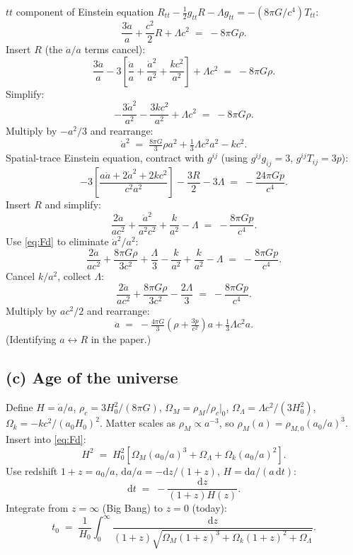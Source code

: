 \documentclass[11pt]{article}
\newcommand{\de}{\mathrm{d}}
\begin{document}
$tt$ component of Einstein equation $R_{tt}-\tfrac12 g_{tt}R-\Lambda g_{tt}=-(8\pi G/c^4)T_{tt}$:
\[
\frac{3\ddot a}{a}+\frac{c^2}{2}R+\Lambda c^2 \;=\; -8\pi G\rho.
\]
Insert $R$ (the $\ddot a/a$ terms cancel):
\[
\frac{3\ddot a}{a}-3\!\left[\frac{\ddot a}{a}+\frac{\dot a^2}{a^2}+\frac{kc^2}{a^2}\right]+\Lambda c^2 \;=\; -8\pi G\rho.
\]
Simplify:
\[
-\frac{3\dot a^2}{a^2}-\frac{3kc^2}{a^2}+\Lambda c^2 \;=\; -8\pi G\rho.
\]
Multiply by $-a^2/3$ and rearrange:
\begin{equation}
\boxed{\;\dot a^2 \;=\; \tfrac{8\pi G}{3}\rho a^2 + \tfrac{1}{3}\Lambda c^2 a^2 - kc^2.\;}
\label{eq:Fd}
\end{equation}
Spatial-trace Einstein equation, contract with $g^{ij}$ (using $g^{ij}g_{ij}=3$, $g^{ij}T_{ij}=3p$):
\[
-3\!\left[\frac{a\ddot a+2\dot a^2+2kc^2}{c^2 a^2}\right]-\frac{3R}{2}-3\Lambda \;=\; -\frac{24\pi G p}{c^4}.
\]
Insert $R$ and simplify:
\[
\frac{2\ddot a}{a c^2}+\frac{\dot a^2}{a^2 c^2}+\frac{k}{a^2}-\Lambda \;=\; -\frac{8\pi G p}{c^4}.
\]
Use \eqref{eq:Fd} to eliminate $\dot a^2/a^2$:
\[
\frac{2\ddot a}{a c^2}+\frac{8\pi G\rho}{3c^2}+\frac{\Lambda}{3}-\frac{k}{a^2}+\frac{k}{a^2}-\Lambda \;=\; -\frac{8\pi G p}{c^4}.
\]
Cancel $k/a^2$, collect $\Lambda$:
\[
\frac{2\ddot a}{a c^2}+\frac{8\pi G\rho}{3c^2}-\frac{2\Lambda}{3} \;=\; -\frac{8\pi G p}{c^4}.
\]
Multiply by $a c^2/2$ and rearrange:
\begin{equation}
\boxed{\;\ddot a \;=\; -\tfrac{4\pi G}{3}\!\left(\rho+\tfrac{3p}{c^2}\right)\!a + \tfrac{1}{3}\Lambda c^2 a.\;}
\label{eq:Fdd}
\end{equation}
(Identifying $a\leftrightarrow R$ in the paper.)

\subsection*{(c) Age of the universe}

Define $H=\dot a/a$, $\rho_c=3H_0^2/(8\pi G)$, $\Omega_M=\rho_M/\rho_c|_0$, $\Omega_\Lambda=\Lambda c^2/(3H_0^2)$, $\Omega_k=-kc^2/(a_0 H_0)^2$. Matter scales as $\rho_M\propto a^{-3}$, so $\rho_M(a)=\rho_{M,0}(a_0/a)^3$. Insert into \eqref{eq:Fd}:
\[
H^2 \;=\; H_0^2\!\left[\Omega_M(a_0/a)^3 + \Omega_\Lambda + \Omega_k(a_0/a)^2\right].
\]
Use redshift $1+z=a_0/a$, $\de a/a=-\de z/(1+z)$, $H=\de a/(a\,\de t)$:
\[
\de t \;=\; -\frac{\de z}{(1+z)H(z)}.
\]
Integrate from $z=\infty$ (Big Bang) to $z=0$ (today):
\begin{equation}
\boxed{\;t_0 \;=\; \frac{1}{H_0}\int_0^{\infty}\!\frac{\de z}{(1+z)\sqrt{\Omega_M(1+z)^3+\Omega_k(1+z)^2+\Omega_\Lambda}}.\;}
\label{eq:t0}
\end{equation}
\end{document}
